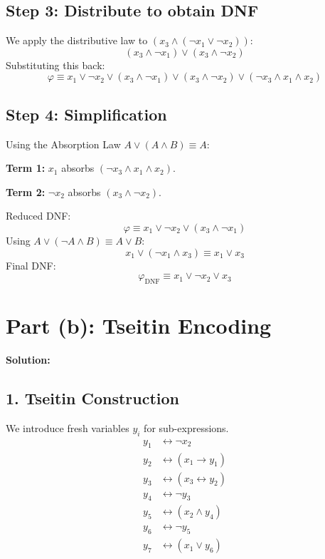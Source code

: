 \documentclass[12pt,a4paper]{article}
\begin{document}
\subsection*{Step 3: Distribute to obtain DNF}
We apply the distributive law to $(x_3 \land (\neg x_1 \lor \neg x_2))$:
\[ (x_3 \land \neg x_1) \lor (x_3 \land \neg x_2) \]
Substituting this back:
\[ \varphi \equiv x_1 \lor \neg x_2 \lor (x_3 \land \neg x_1) \lor (x_3 \land \neg x_2) \lor (\neg x_3 \land x_1 \land x_2) \]

\subsection*{Step 4: Simplification}
Using the Absorption Law $A \lor (A \land B) \equiv A$:

\noindent \textbf{Term 1:} $x_1$ absorbs $(\neg x_3 \land x_1 \land x_2)$.

\noindent \textbf{Term 2:} $\neg x_2$ absorbs $(x_3 \land \neg x_2)$.

\noindent Reduced DNF:
\[ \varphi \equiv x_1 \lor \neg x_2 \lor (x_3 \land \neg x_1) \]
Using $A \lor (\neg A \land B) \equiv A \lor B$:
\[ x_1 \lor (\neg x_1 \land x_3) \equiv x_1 \lor x_3 \]
Final DNF:
\[ \varphi_{\text{DNF}} \equiv x_1 \lor \neg x_2 \lor x_3 \]

\newpage

\section*{Part (b): Tseitin Encoding}

\textbf{Solution:}

\subsection*{1. Tseitin Construction}
We introduce fresh variables $y_i$ for sub-expressions.
\begin{align*}
    y_1 &\leftrightarrow \neg x_2 \\
    y_2 &\leftrightarrow (x_1 \to y_1) \\
    y_3 &\leftrightarrow (x_3 \leftrightarrow y_2) \\
    y_4 &\leftrightarrow \neg y_3 \\
    y_5 &\leftrightarrow (x_2 \land y_4) \\
    y_6 &\leftrightarrow \neg y_5 \\
    y_7 &\leftrightarrow (x_1 \lor y_6)
\end{align*}
\end{document}
